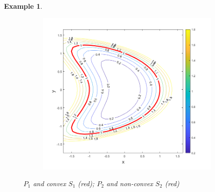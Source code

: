 \documentclass[11pt]{article}
\newtheorem{example}{Example}
\begin{document}
\begin{example}
\begin{figure}[!htb]
\begin{subfigure}{0.5\textwidth}
    \includegraphics[scale=0.45]{non_convex_S_levelsets.png}
    \end{subfigure}
    \caption{$P_1$ and convex $S_{1}$ (red); $P_2$ and non-convex $S_2$ (red)}
    \label{fig:non_convex_SQ}
\end{figure}
\end{example}
\end{document}
